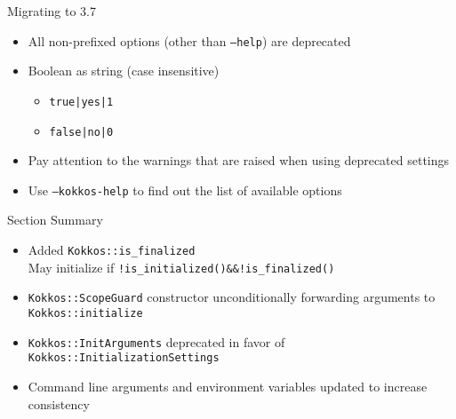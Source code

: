 \begin{frame}[fragile]{Migrating to 3.7}
\begin{itemize}
\item All non-prefixed options (other than \texttt{--help}) are deprecated
\item Boolean as string (case insensitive) 
  \begin{itemize}
  \item \texttt{true|yes|1}
  \item \texttt{false|no|0}
  \end{itemize}
\item Pay attention to the warnings that are raised when using deprecated settings
\item Use \texttt{--kokkos-help} to find out the list of available options
\end{itemize}

\end{frame}


\begin{frame}{Section Summary}

  \begin{itemize}
    \item Added \texttt{Kokkos::is\_finalized} \\
    May initialize if \texttt{!is\_initialized()\&\&!is\_finalized()}
    \item \texttt{Kokkos::ScopeGuard} constructor unconditionally forwarding arguments to \texttt{Kokkos::initialize}
    \item \texttt{Kokkos::InitArguments} deprecated in favor of \texttt{Kokkos::InitializationSettings}
    \item Command line arguments and environment variables updated to increase consistency
  \end{itemize}

\end{frame}
